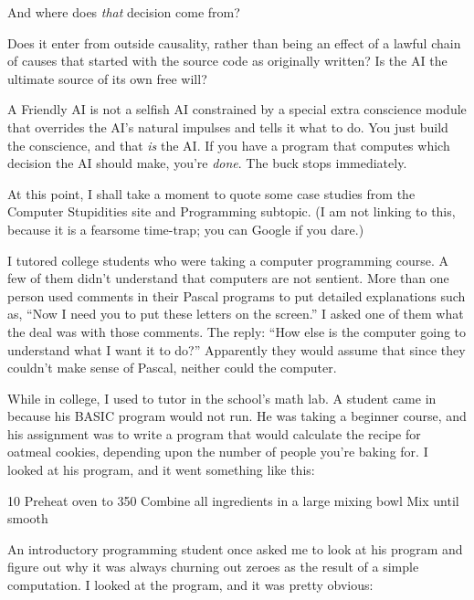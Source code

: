 {
 And where does \textit{that} decision come from?}

{
 Does it enter from outside causality, rather than being an effect
of a lawful chain of causes that started with the source code as
originally written? Is the AI the ultimate source of its own free
will?}

{
 A Friendly AI is not a selfish AI constrained by a special extra
conscience module that overrides the AI's natural
impulses and tells it what to do. You just build the conscience, and
that \textit{is} the AI. If you have a program that computes which
decision the AI should make, you're \textit{done}. The
buck stops immediately.}

{
 At this point, I shall take a moment to quote some case studies
from the Computer Stupidities site and Programming subtopic. (I am not
linking to this, because it is a fearsome time-trap; you can Google if
you dare.)}

{
 I tutored college students who were taking a computer programming
course. A few of them didn't understand that computers
are not sentient. More than one person used comments in their Pascal
programs to put detailed explanations such as, ``Now I
need you to put these letters on the screen.'' I
asked one of them what the deal was with those comments. The reply:
``How else is the computer going to understand what I
want it to do?'' Apparently they would assume that
since they couldn't make sense of Pascal, neither could
the computer.}

{
 While in college, I used to tutor in the school's
math lab. A student came in because his BASIC program would not run. He
was taking a beginner course, and his assignment was to write a program
that would calculate the recipe for oatmeal cookies, depending upon the
number of people you're baking for. I looked at his
program, and it went something like this:}

{
 10 Preheat oven to 350 Combine all ingredients in a large mixing bowl Mix until smooth}

{
 An introductory programming student once asked me to look at his
program and figure out why it was always churning out zeroes as the
result of a simple computation. I looked at the program, and it was
pretty obvious:}

